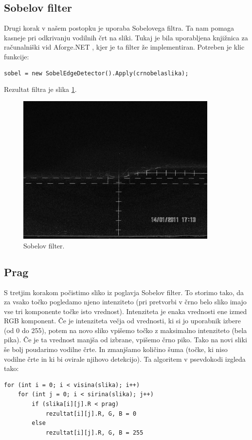 \documentclass[oneside, a4paper, 12pt]{book}
\begin{document}
\subsection{Sobelov filter}
Drugi korak v našem postopku je uporaba Sobelovega filtra. Ta nam pomaga kasneje pri odkrivanju  vodilnih črt na sliki. Tukaj je bila uporabljena knjižnica za računalniški vid Aforge.NET \cite{sobel}, kjer je ta filter že implementiran. Potreben je klic funkcije:
\begin{verbatim}
sobel = new SobelEdgeDetector().Apply(crnobelaslika);
\end{verbatim}

Rezultat filtra je slika \ref{pic:sobel}.

\begin{figure}
\begin{center}
\includegraphics[width=10cm]{slike/sobel.jpg}
\end{center}
\caption{Sobelov filter.}
\label{pic:sobel}
\end{figure}

\subsection{Prag}
S tretjim korakom počistimo sliko iz poglavja Sobelov filter. To storimo tako, da za vsako točko pogledamo njeno intenziteto (pri pretvorbi v črno belo sliko imajo vse tri komponente točke isto vrednost). Intenziteta je enaka vrednosti ene izmed RGB komponent. Če je intenziteta večja od vrednosti, ki si jo uporabnik izbere (od 0 do 255), potem na novo sliko vpišemo točko z maksimalno intenziteto (bela pika). Če je ta vrednost manjša od izbrane, vpišemo črno piko. Tako na novi sliki še bolj poudarimo vodilne črte. In zmanjšamo količino šuma (točke, ki niso vodilne črte in ki bi ovirale njihovo detekcijo). Ta algoritem v psevdokodi izgleda tako:
\begin{verbatim}
for (int i = 0; i < visina(slika); i++)
    for (int j = 0; i < sirina(slika); j++)
        if (slika[i][j].R < prag)
            rezultat[i][j].R, G, B = 0
        else
            rezultat[i][j].R, G, B = 255
\end{verbatim}
\end{document}
